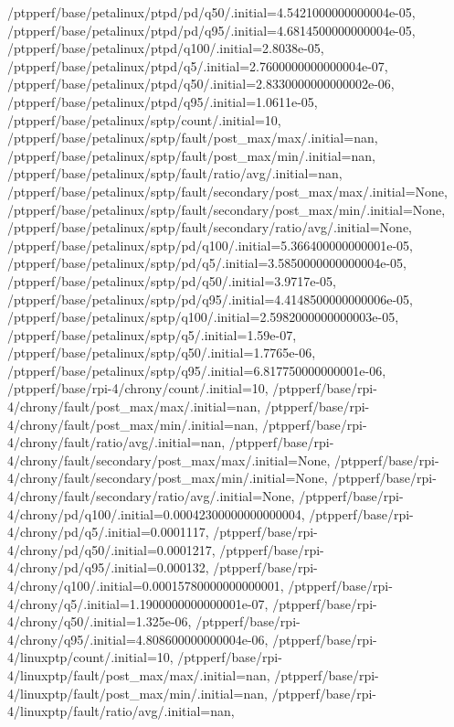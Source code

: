 {    /ptpperf/base/petalinux/ptpd/pd/q50/.initial=4.5421000000000004e-05,
    /ptpperf/base/petalinux/ptpd/pd/q95/.initial=4.6814500000000004e-05,
    /ptpperf/base/petalinux/ptpd/q100/.initial=2.8038e-05,
    /ptpperf/base/petalinux/ptpd/q5/.initial=2.7600000000000004e-07,
    /ptpperf/base/petalinux/ptpd/q50/.initial=2.8330000000000002e-06,
    /ptpperf/base/petalinux/ptpd/q95/.initial=1.0611e-05,
    /ptpperf/base/petalinux/sptp/count/.initial=10,
    /ptpperf/base/petalinux/sptp/fault/post_max/max/.initial=nan,
    /ptpperf/base/petalinux/sptp/fault/post_max/min/.initial=nan,
    /ptpperf/base/petalinux/sptp/fault/ratio/avg/.initial=nan,
    /ptpperf/base/petalinux/sptp/fault/secondary/post_max/max/.initial=None,
    /ptpperf/base/petalinux/sptp/fault/secondary/post_max/min/.initial=None,
    /ptpperf/base/petalinux/sptp/fault/secondary/ratio/avg/.initial=None,
    /ptpperf/base/petalinux/sptp/pd/q100/.initial=5.366400000000001e-05,
    /ptpperf/base/petalinux/sptp/pd/q5/.initial=3.5850000000000004e-05,
    /ptpperf/base/petalinux/sptp/pd/q50/.initial=3.9717e-05,
    /ptpperf/base/petalinux/sptp/pd/q95/.initial=4.4148500000000006e-05,
    /ptpperf/base/petalinux/sptp/q100/.initial=2.5982000000000003e-05,
    /ptpperf/base/petalinux/sptp/q5/.initial=1.59e-07,
    /ptpperf/base/petalinux/sptp/q50/.initial=1.7765e-06,
    /ptpperf/base/petalinux/sptp/q95/.initial=6.817750000000001e-06,
    /ptpperf/base/rpi-4/chrony/count/.initial=10,
    /ptpperf/base/rpi-4/chrony/fault/post_max/max/.initial=nan,
    /ptpperf/base/rpi-4/chrony/fault/post_max/min/.initial=nan,
    /ptpperf/base/rpi-4/chrony/fault/ratio/avg/.initial=nan,
    /ptpperf/base/rpi-4/chrony/fault/secondary/post_max/max/.initial=None,
    /ptpperf/base/rpi-4/chrony/fault/secondary/post_max/min/.initial=None,
    /ptpperf/base/rpi-4/chrony/fault/secondary/ratio/avg/.initial=None,
    /ptpperf/base/rpi-4/chrony/pd/q100/.initial=0.00042300000000000004,
    /ptpperf/base/rpi-4/chrony/pd/q5/.initial=0.0001117,
    /ptpperf/base/rpi-4/chrony/pd/q50/.initial=0.0001217,
    /ptpperf/base/rpi-4/chrony/pd/q95/.initial=0.000132,
    /ptpperf/base/rpi-4/chrony/q100/.initial=0.00015780000000000001,
    /ptpperf/base/rpi-4/chrony/q5/.initial=1.1900000000000001e-07,
    /ptpperf/base/rpi-4/chrony/q50/.initial=1.325e-06,
    /ptpperf/base/rpi-4/chrony/q95/.initial=4.808600000000004e-06,
    /ptpperf/base/rpi-4/linuxptp/count/.initial=10,
    /ptpperf/base/rpi-4/linuxptp/fault/post_max/max/.initial=nan,
    /ptpperf/base/rpi-4/linuxptp/fault/post_max/min/.initial=nan,
    /ptpperf/base/rpi-4/linuxptp/fault/ratio/avg/.initial=nan,
}
